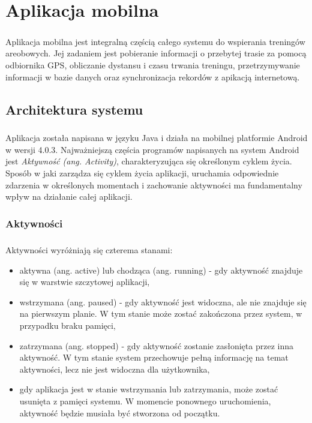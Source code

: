 \chapter{Aplikacja mobilna} %
\label{cha:mobileapp}

\paragraph{} %
\label{par:}
Aplikacja mobilna jest integralną częścią całego systemu do wspierania treningów areobowych. Jej zadaniem jest pobieranie informacji o przebytej trasie za pomocą odbiornika GPS, obliczanie dystansu i czasu trwania treningu, przetrzymywanie informacji w bazie danych oraz synchronizacja rekordów z apikacją internetową. 

\section{Architektura systemu} %
\label{sec:architektura_system}

\paragraph{} %
\label{par:}
Aplikacja została napisana w języku Java i działa na mobilnej platformie Android w wersji 4.0.3. Najważniejszą częścia programów napisanych na system Android jest \textit{Aktywność (ang. Activity)}, charakteryzująca się określonym cyklem życia. Sposób w jaki zarządza się cyklem życia aplikacji, uruchamia odpowiednie zdarzenia w określonych momentach i zachowanie aktywności ma fundamentalny wpływ na działanie całej aplikacji.

\subsection{Aktywności} %
\label{sub:aktywno_ci}

\paragraph{} %
\label{par:}
Aktywności wyróżniają się czterema stanami:
\begin{itemize}
	\item aktywna (ang. active) lub chodząca (ang. running) - gdy aktywność znajduje się w warstwie szczytowej aplikacji,
	\item wstrzymana (ang. paused) - gdy aktywność jest widoczna, ale nie znajduje się na pierwszym planie. W tym stanie może zostać zakończona przez system, w przypadku braku pamięci,
	\item zatrzymana (ang. stopped) - gdy aktywność zostanie zasłonięta przez inna aktywność. W tym stanie system przechowuje pełną informację na temat aktywności, lecz nie jest widoczna dla użytkownika,
	\item gdy aplikacja jest w stanie wstrzymania lub zatrzymania, może zostać usunięta z pamięci systemu. W momencie ponownego uruchomienia, aktywność będzie musiała być stworzona od początku.
\end{itemize}

